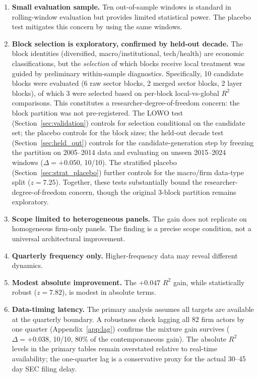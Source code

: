 \documentclass[11pt,a4paper]{article}
\begin{document}
\begin{enumerate}[nosep]
  \item \textbf{Small evaluation sample.} Ten out-of-sample windows is standard in rolling-window evaluation but provides limited statistical power. The placebo test mitigates this concern by using the same windows.
  \item \textbf{Block selection is exploratory, confirmed by held-out decade.} The block identities (diversified, macro/institutional, tech/health) are economic classifications, but the \emph{selection} of which blocks receive local treatment was guided by preliminary within-sample diagnostics. Specifically, 10 candidate blocks were evaluated (6 raw sector blocks, 2 merged sector blocks, 2 layer blocks), of which 3 were selected based on per-block local-vs-global $R^2$ comparisons. This constitutes a researcher-degree-of-freedom concern: the block partition was not pre-registered. The LOWO test (Section~\ref{sec:validation}) controls for selection conditional on the candidate set; the placebo controls for the block sizes; the held-out decade test (Section~\ref{sec:held_out}) controls for the candidate-generation step by freezing the partition on 2005--2014 data and evaluating on unseen 2015--2024 windows ($\Delta = +0.050$, 10/10). The stratified placebo (Section~\ref{sec:strat_placebo}) further controls for the macro/firm data-type split ($z = 7.25$). Together, these tests substantially bound the researcher-degree-of-freedom concern, though the original 3-block partition remains exploratory.
  \item \textbf{Scope limited to heterogeneous panels.} The gain does not replicate on homogeneous firm-only panels. The finding is a precise scope condition, not a universal architectural improvement.
  \item \textbf{Quarterly frequency only.} Higher-frequency data may reveal different dynamics.
  \item \textbf{Modest absolute improvement.} The $+0.047$ $R^2$ gain, while statistically robust ($z = 7.82$), is modest in absolute terms.
  \item \textbf{Data-timing latency.} The primary analysis assumes all targets are available at the quarterly boundary. A robustness check lagging all 82 firm actors by one quarter (Appendix~\ref{app:lag}) confirms the mixture gain survives ($\Delta = +0.038$, 10/10, 80\% of the contemporaneous gain). The absolute $R^2$ levels in the primary tables remain overstated relative to real-time availability; the one-quarter lag is a conservative proxy for the actual 30--45 day SEC filing delay.

\end{enumerate}
\end{document}
